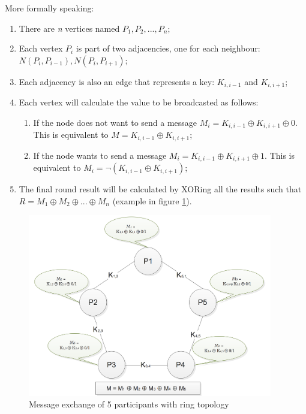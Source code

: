More formally speaking: 
\begin{enumerate}
    \item There are \textit{n} vertices named \textit{$P_1, P_2, ..., P_n$};
    \item Each vertex \textit{$P_i$} is part of two adjacencies, one for each neighbour: \textit{$N(P_i,P_{i-1}), N(P_i, P_{i+1})$};
    \item Each adjacency is also an edge that represents a key: \textit{$K_{i,i-1}$} and \textit{$K_{i,i+1}$};
    \item Each vertex will calculate the value to be broadcasted as follows: \begin{enumerate}
        \item If the node does not want to send a message \textit{$M_i = K_{i,i-1} \oplus K_{i,i+1} \oplus 0 $}. This is equivalent to \textit{$M = K_{i,i-1} \oplus K_{i,i+1}$};
        \item If the node wants to send a message \textit{$M_i = K_{i,i-1} \oplus K_{i,i+1} \oplus 1 $}. This is equivalent to \textit{$M_i = \neg(K_{i,i-1} \oplus K_{i,i+1}) $};
    \end{enumerate}
    \item The final round result will be calculated by XORing all the results such that \textit{$R = M_1 \oplus M_2 \oplus ... \oplus M_n$} (example in figure \ref{fig:nparticipants1}).
\end{enumerate}


\begin{figure}[h!]
    \centering
    \includegraphics[width=0.95\textwidth]{Images/nparticipants1.png}
    \caption{Message exchange of 5 participants with ring topology}
    \label{fig:nparticipants1}
\end{figure}


